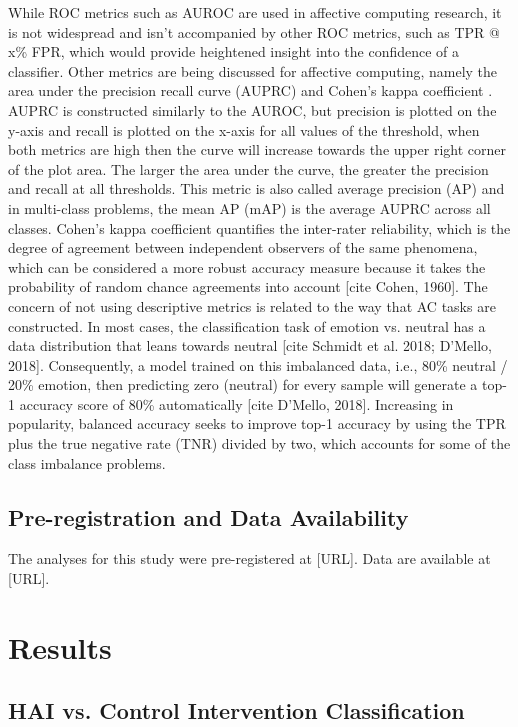 \documentclass[12pt]{iopart}
\begin{document}
While ROC metrics such as AUROC are used in affective computing research, it is not widespread and isn’t accompanied by other ROC metrics, such as TPR @ x\% FPR, which would provide heightened insight into the confidence of a classifier.  Other metrics are being discussed for affective computing, namely the area under the precision recall curve (AUPRC) and Cohen’s kappa coefficient \cite{d2018affective}.  AUPRC is constructed similarly to the AUROC, but precision is plotted on the y-axis and recall is plotted on the x-axis for all values of the threshold, when both metrics are high then the curve will increase towards the upper right corner of the plot area.  The larger the area under the curve, the greater the precision and recall at all thresholds.  This metric is also called average precision (AP) and in multi-class problems, the mean AP (mAP) is the average AUPRC across all classes.  Cohen’s kappa coefficient quantifies the inter-rater reliability, which is the degree of agreement between independent observers of the same phenomena, which can be considered a more robust accuracy measure because it takes the probability of random chance agreements into account [cite Cohen, 1960].  The concern of not using descriptive metrics is related to the way that AC tasks are constructed.  In most cases, the classification task of emotion vs. neutral has a data distribution that leans towards neutral [cite Schmidt et al. 2018; D’Mello, 2018].  Consequently, a model trained on this imbalanced data, i.e., 80\% neutral / 20\% emotion, then predicting zero (neutral) for every sample will generate a top-1 accuracy score of 80\% automatically [cite D’Mello, 2018].  Increasing in popularity, balanced accuracy seeks to improve top-1 accuracy by using the TPR plus the true negative rate (TNR) divided by two, which accounts for some of the class imbalance problems.

\subsection*{Pre-registration and Data Availability}
The analyses for this study were pre-registered at [URL]. Data are available at [URL].


\section*{Results}
\subsection*{HAI vs. Control Intervention Classification}
\end{document}
